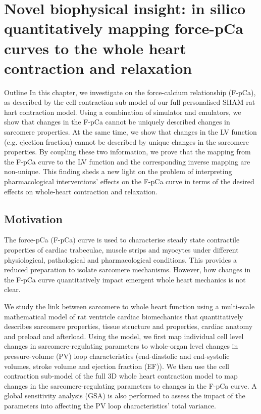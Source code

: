 \chapter{Novel biophysical insight: in silico quantitatively mapping force-pCa curves to the whole heart contraction and relaxation}\label{cha:chapter8}
%
%
%
\begin{remark}{Outline}
    In this chapter, we investigate on the force-calcium relationship (F-pCa), as described by the cell contraction sub-model of our full personalised SHAM rat hart contraction model. Using a combination of simulator and emulators, we show that changes in the F-pCa cannot be uniquely described changes in sarcomere properties. At the same time, we show that changes in the LV function (e.g. ejection fraction) cannot be described by unique changes in the sarcomere properties. By coupling these two information, we prove that the mapping from the F-pCa curve to the LV function and the corresponding inverse mapping are non-unique. This finding sheds a new light on the problem of interpreting pharmacological interventions' effects on the F-pCa curve in terms of the desired effects on whole-heart contraction and relaxation.
\end{remark}


%
%
%
\section{Motivation}\label{sec:ch8motivation}

\noindent
The force-pCa (F-pCa) curve is used to characterise steady state contractile properties of cardiac trabeculae, muscle strips and myocytes under different physiological, pathological and pharmacological conditions. This provides a reduced preparation to isolate sarcomere mechanisms. However, how changes in the F-pCa curve quantitatively impact emergent whole heart mechanics is not clear.

We study the link between sarcomere to whole heart function using a multi-scale mathematical model of rat ventricle cardiac biomechanics that quantitatively describes sarcomere properties, tissue structure and properties, cardiac anatomy and preload and afterload. Using the model, we first map individual cell level changes in sarcomere-regulating parameters to whole-organ level changes in pressure-volume (PV) loop characteristics (end-diastolic and end-systolic volumes, stroke volume and ejection fraction (EF)). We then use the cell contraction sub-model of the full $3$D whole heart contraction model to map changes in the sarcomere-regulating parameters to changes in the F-pCa curve. A global sensitivity analysis (GSA) is also performed to assess the impact of the parameters into affecting the PV loop characteristics' total variance.

